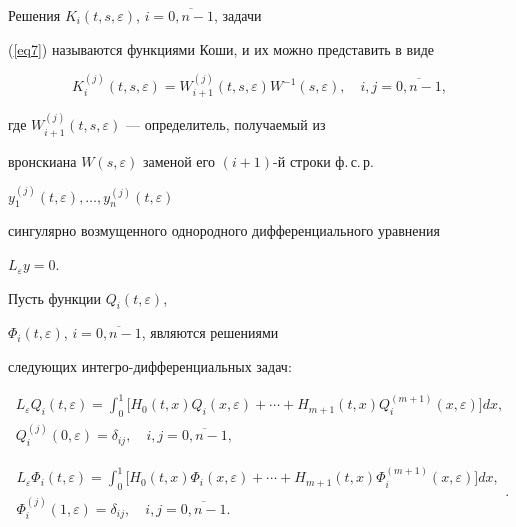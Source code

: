 Решения $K_{i}(t,s,\varepsilon)$, $i=\overline{0,n-1}$, задачи 


(\ref{eq7}) называются функциями Коши, и их можно представить в виде


$$


K_{i}^{(j)}(t,s,\varepsilon)=W_{i+1}^{(j)}(t,s,\varepsilon)


W^{-1}(s,\varepsilon),\quad i,j=\overline{0,n-1},


$$


где $W_{i+1}^{(j)}(t,s,\varepsilon)$ --- определитель, получаемый из 


вронскиана $W(s,\varepsilon)$ заменой его $(i+1)$-й строки ф.\,с.\,р. 


$y_{1}^{(j)} (t,\varepsilon ), \dotsc, y_{n}^{(j)} (t,\varepsilon )$ 


сингулярно возмущенного однородного дифференциального уравнения 


$L_{\varepsilon}y=0$. 





Пусть функции $Q_{i}(t,\varepsilon)$, 


$\Phi _{i}(t,\varepsilon)$, $i=\overline{0,n-1}$, являются решениями 


следующих интегро-дифференциальных задач:


\begin{equation}


\label{eq8}


\begin{array}{l}


L_{\varepsilon}Q_{i}(t,\varepsilon)=\displaystyle\int_{0}^{1}


\big[H_{0}(t,x)Q_{i}(x,\varepsilon)+\dotsb+H_{m+1}(t,x)Q_{i}^{(m+1)} 


(x,\varepsilon)\big]dx, \\ 


Q_{i}^{(j)}(0,\varepsilon)=\delta _{ij},\quad i,j=\overline{0,n-1}, 


\end{array}


\end{equation}


\begin{equation}


\label{eq9}


\begin{array}{l}


L_{\varepsilon}\Phi _{i}(t,\varepsilon)=\displaystyle\int_{0}^{1} 


\big[H_{0}(t,x)\Phi _{i}(x,\varepsilon)+\dotsb+H_{m+1}(t,x)\Phi 


_{i}^{(m+1)}(x,\varepsilon)\big]dx, \\ 


\Phi _{i}^{(j)}(1,\varepsilon)=\delta _{ij},\quad i,j=\overline{0,n-1}.


\end{array} \bigg.


\end{equation}


